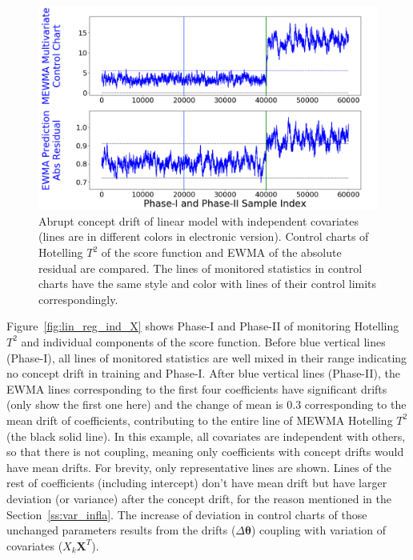 \documentclass[twoside,11pt]{article}
\begin{document}
\begin{enumerate}[(I)]
\begin{figure}[!htp]
\centering
\includegraphics[width = 0.6\linewidth]{../figures/v14/sim_2/reg/1_sim2_lin_1e-08_0_005_1.png}
  \caption{Abrupt concept drift of linear model with independent covariates (lines are in different colors in electronic version). Control charts of Hotelling $T^2$ of the score function and EWMA of the absolute residual are compared. The lines of monitored statistics in control charts have the same style and color with lines of their control limits correspondingly.}
  \label{fig:lin_reg_ind_X_comp}
\end{figure}

Figure~\ref{fig:lin_reg_ind_X} shows Phase-I and Phase-II of monitoring Hotelling $T^2$ and individual components of the score function. Before blue vertical lines (Phase-I), all lines of monitored statistics are well mixed in their range indicating no concept drift in training and Phase-I. After blue vertical lines (Phase-II), the EWMA lines corresponding to the first four coefficients have significant drifts (only show the first one here) and the change of mean is $0.3$ corresponding to the mean drift of coefficients, contributing to the entire line of MEWMA Hotelling $T^2$ (the black solid line). In this example, all covariates are independent with others, so that there is not coupling, meaning only coefficients with concept drifts would have mean drifts. For brevity, only representative lines are shown. Lines of the rest of coefficients (including intercept) don't have mean drift but have larger deviation (or variance) after the concept drift, for the reason mentioned in the Section~\ref{ss:var_infla}. The increase of deviation in control charts of those unchanged parameters results from the drifts ($\Delta \bm { \theta}$) coupling with variation of covariates ($X_k\bm {X}^T$).


\end{enumerate}
\end{document}
